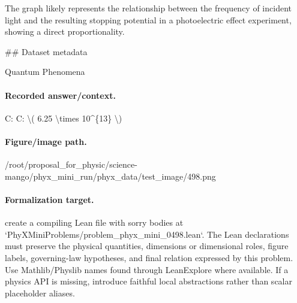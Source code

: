 The graph likely represents the relationship between the frequency of incident light and the resulting stopping potential in a photoelectric effect experiment, showing a direct proportionality.

\#\# Dataset metadata

Quantum Phenomena

\paragraph{Recorded answer/context.}
C: C: \textbackslash{}( 6.25 \textbackslash{}times 10\textasciicircum{}\{13\} \textbackslash{})

\paragraph{Figure/image path.}
/root/proposal\_for\_physic/science-mango/phyx\_mini\_run/phyx\_data/test\_image/498.png

\paragraph{Formalization target.}
create a compiling Lean file with sorry bodies at `PhyXMiniProblems/problem\_phyx\_mini\_0498.lean`. The Lean declarations must preserve the physical quantities, dimensions or dimensional roles, figure labels, governing-law hypotheses, and final relation expressed by this problem.
Use Mathlib/Physlib names found through LeanExplore where available. If a physics API is missing, introduce faithful local abstractions rather than scalar placeholder aliases.

